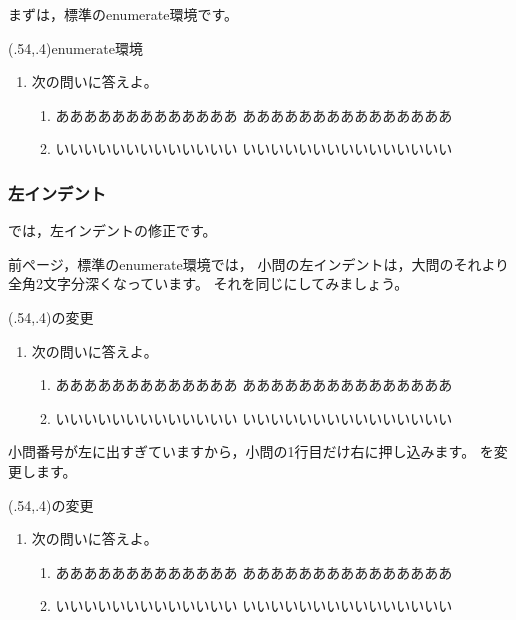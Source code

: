 \documentclass[fleqn,a4j]{jarticle}
\begin{document}
まずは，標準の\textsf{enumerate}環境です。

\begin{showEx}(.54,.4){\textsf{enumerate}環境}
\begin{enumerate}[1.~]
  \item 次の問いに答えよ。
    \begin{enumerate}[(1)]
      \item あああああああああああああ
        あああああああああああああああ
      \item いいいいいいいいいいいいい
        いいいいいいいいいいいいいいい
    \end{enumerate}
\end{enumerate}
\end{showEx}

\clearpage

\subsubsection{左インデント}
では，左インデントの修正です。

前ページ，標準の\textsf{enumerate}環境では，
小問の左インデントは，大問のそれより全角2文字分深くなっています。
それを同じにしてみましょう。

\begin{showEx}(.54,.4){の変更}
\begin{enumerate}[1.~]
  \item 次の問いに答えよ。
    \begin{enumerate}%
    <apnenum={\leftmargin=0zw}>[(1)]
      \item あああああああああああああ
        あああああああああああああああ
      \item いいいいいいいいいいいいい
        いいいいいいいいいいいいいいい
    \end{enumerate}
\end{enumerate}
\end{showEx}

小問番号が左に出すぎていますから，小問の1行目だけ右に押し込みます。
を変更します。

\begin{showEx}(.54,.4){の変更}
\begin{enumerate}[1.~]
  \item 次の問いに答えよ。
    \begin{enumerate}%
    <apnenum={\leftmargin=0zw%
              \itemindent=1zw%
             }>[(1)]
      \item あああああああああああああ
        あああああああああああああああ
      \item いいいいいいいいいいいいい
        いいいいいいいいいいいいいいい
    \end{enumerate}
\end{enumerate}
\end{showEx}
\end{document}

